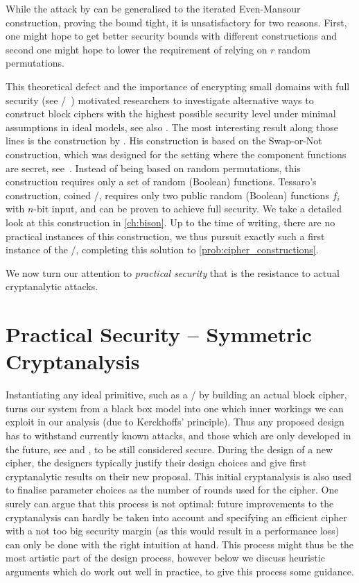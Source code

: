 While the attack by \textcite{AC:Daemen91} can be generalised to the iterated Even-Mansour construction, proving the bound tight, it is unsatisfactory for two reasons.
First, one might hope to get better security bounds with different constructions and second one might hope to lower the requirement of relying on $r$ random permutations.

This theoretical defect and the importance of encrypting small domains with full security (see \eg/~\cite{AC:MirYil17}) motivated researchers to investigate alternative ways to construct block ciphers with the highest possible security level under minimal assumptions in ideal models, see also .
The most interesting result along those lines is the construction by \textcite{AC:Tessaro15}.
His construction is based on the Swap-or-Not construction, which was designed for the setting where the component functions are secret, see~\cite{C:HoaMorRog12}.
Instead of being based on random permutations, this construction requires only a set of random (Boolean) functions.
Tessaro's construction, coined \WSNf/, requires only two public random (Boolean) functions $f_i$ with $n$-bit input, and can be proven to achieve full security.
We take a detailed look at this construction in \cref{ch:bison}.
Up to the time of writing, there are no practical instances of this construction, we thus pursuit exactly such a first instance of the \WSN/, completing this solution to \cref{prob:cipher_constructions}.

We now turn our attention to \emph{practical security} that is the resistance to actual cryptanalytic attacks.

\section{Practical Security -- Symmetric Cryptanalysis}\label{sec:prelim:cryptanalysis}
Instantiating any ideal primitive, such as a \PRP/ by building an actual block cipher, turns our system from a black box model into one which inner workings we can exploit in our analysis (due to Kerckhoffs' principle).
Thus any proposed design has to withstand currently known attacks, and those which are only developed in the future, see  and , to be still considered secure.
During the design of a new cipher, the designers typically justify their design choices and give first cryptanalytic results on their new proposal.
This initial cryptanalysis is also used to finalise parameter choices as the number of rounds used for the cipher.
One surely can argue that this process is not optimal: future improvements to the cryptanalysis can hardly be taken into account and specifying an efficient cipher with a not too big security margin (as this would result in a performance loss) can only be done with the right intuition at hand.
This process might thus be the most artistic part of the design process, however below we discuss heuristic arguments which do work out well in practice, to give this process some guidance.

